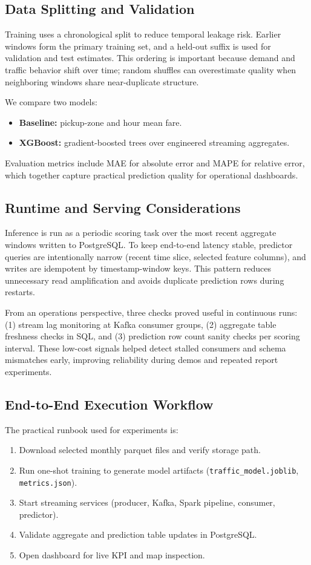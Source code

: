 \documentclass[conference]{IEEEtran}
\begin{document}
\subsection{Data Splitting and Validation}
Training uses a chronological split to reduce temporal leakage risk. Earlier windows form the primary training set, and a held-out suffix is used for validation and test estimates. This ordering is important because demand and traffic behavior shift over time; random shuffles can overestimate quality when neighboring windows share near-duplicate structure.

We compare two models:
\begin{itemize}[leftmargin=1.5em]
    \item \textbf{Baseline:} pickup-zone and hour mean fare.
    \item \textbf{XGBoost:} gradient-boosted trees over engineered streaming aggregates.
\end{itemize}
Evaluation metrics include MAE for absolute error and MAPE for relative error, which together capture practical prediction quality for operational dashboards\@.

\subsection{Runtime and Serving Considerations}
Inference is run as a periodic scoring task over the most recent aggregate windows written to PostgreSQL\@. To keep end-to-end latency stable, predictor queries are intentionally narrow (recent time slice, selected feature columns), and writes are idempotent by timestamp-window keys. This pattern reduces unnecessary read amplification and avoids duplicate prediction rows during restarts.

From an operations perspective, three checks proved useful in continuous runs: (1) stream lag monitoring at Kafka consumer groups, (2) aggregate table freshness checks in SQL, and (3) prediction row count sanity checks per scoring interval. These low-cost signals helped detect stalled consumers and schema mismatches early, improving reliability during demos and repeated report experiments.

\subsection{End-to-End Execution Workflow}
The practical runbook used for experiments is:
\begin{enumerate}[leftmargin=1.5em]
    \item Download selected monthly parquet files and verify storage path.
    \item Run one-shot training to generate model artifacts (\texttt{traffic\_model{.}joblib}, \texttt{metrics{.}json}).
    \item Start streaming services (producer, Kafka, Spark pipeline, consumer, predictor).
    \item Validate aggregate and prediction table updates in PostgreSQL\@.
    \item Open dashboard for live KPI and map inspection.
\end{enumerate}
\end{document}
